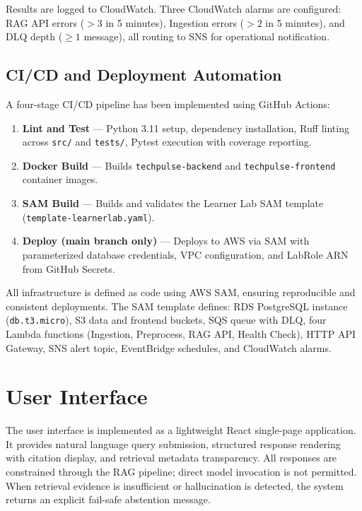 \documentclass[12pt,a4paper]{report}
\begin{document}
Results are logged to CloudWatch. Three CloudWatch alarms are configured: RAG API errors ($>3$ in 5 minutes), Ingestion errors ($>2$ in 5 minutes), and DLQ depth ($\geq 1$ message), all routing to SNS for operational notification.

\subsection{CI/CD and Deployment Automation}

A four-stage CI/CD pipeline has been implemented using GitHub Actions:

\begin{enumerate}[leftmargin=0.5in]
  \item \textbf{Lint and Test} --- Python 3.11 setup, dependency installation, Ruff linting across \texttt{src/} and \texttt{tests/}, Pytest execution with coverage reporting.
  \item \textbf{Docker Build} --- Builds \texttt{techpulse-backend} and \texttt{techpulse-frontend} container images.
  \item \textbf{SAM Build} --- Builds and validates the Learner Lab SAM template (\texttt{template-learnerlab.yaml}).
  \item \textbf{Deploy (main branch only)} --- Deploys to AWS via SAM with parameterized database credentials, VPC configuration, and LabRole ARN from GitHub Secrets.
\end{enumerate}

All infrastructure is defined as code using AWS SAM, ensuring reproducible and consistent deployments. The SAM template defines: RDS PostgreSQL instance (\texttt{db.t3.micro}), S3 data and frontend buckets, SQS queue with DLQ, four Lambda functions (Ingestion, Preprocess, RAG API, Health Check), HTTP API Gateway, SNS alert topic, EventBridge schedules, and CloudWatch alarms.

\section{User Interface}
\label{sec:ui}

The user interface is implemented as a lightweight React single-page application. It provides natural language query submission, structured response rendering with citation display, and retrieval metadata transparency. All responses are constrained through the RAG pipeline; direct model invocation is not permitted. When retrieval evidence is insufficient or hallucination is detected, the system returns an explicit fail-safe abstention message.
\end{document}
